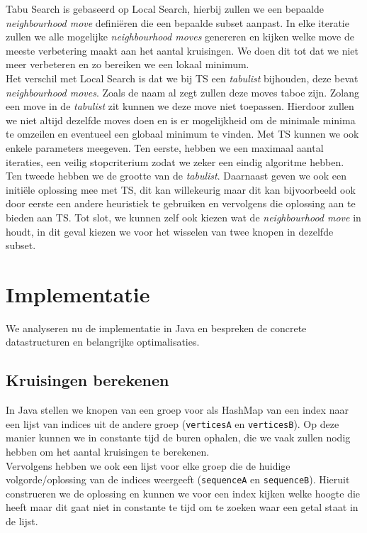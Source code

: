 \documentclass[kulak]{kulakarticle} %
\begin{document}
Tabu Search is gebaseerd op Local Search, hierbij zullen we een bepaalde \textit{neighbourhood move} definiëren die een bepaalde subset aanpast. In elke iteratie zullen we alle mogelijke \textit{neighbourhood moves} genereren en kijken welke move de meeste verbetering maakt aan het aantal kruisingen. We doen dit tot dat we niet meer verbeteren en zo bereiken we een lokaal minimum. \\

\noindent Het verschil met Local Search is dat we bij TS een \textit{tabulist} bijhouden, deze bevat \textit{neighbourhood moves}. Zoals de naam al zegt zullen deze moves taboe zijn. Zolang een move in de \textit{tabulist} zit kunnen we deze move niet toepassen. Hierdoor zullen we niet altijd dezelfde moves doen en is er mogelijkheid om de minimale minima te omzeilen en eventueel een globaal minimum te vinden. Met TS kunnen we ook enkele parameters meegeven. Ten eerste, hebben we een maximaal aantal iteraties, een veilig stopcriterium zodat we zeker een eindig algoritme hebben. Ten tweede hebben we de grootte van de \textit{tabulist}. Daarnaast geven we ook een initiële oplossing mee met TS, dit kan willekeurig maar dit kan bijvoorbeeld ook door eerste een andere heuristiek te gebruiken en vervolgens die oplossing aan te bieden aan TS. Tot slot, we kunnen zelf ook kiezen wat de \textit{neighbourhood move} in houdt, in dit geval kiezen we voor het wisselen van twee knopen in dezelfde subset.

\section{Implementatie}

We analyseren nu de implementatie in Java en bespreken de concrete datastructuren en belangrijke optimalisaties.

\subsection{Kruisingen berekenen}

In Java stellen we knopen van een groep voor als HashMap van een index naar een lijst van indices uit de andere groep (\texttt{verticesA} en \texttt{verticesB}). Op deze manier kunnen we in constante tijd de buren ophalen, die we vaak zullen nodig hebben om het aantal kruisingen te berekenen. \\

\noindent Vervolgens hebben we ook een lijst voor elke groep die de huidige volgorde/oplossing van de indices weergeeft (\texttt{sequenceA} en \texttt{sequenceB}). Hieruit construeren we de oplossing en kunnen we voor een index kijken welke hoogte die heeft maar dit gaat niet in constante te tijd om te zoeken waar een getal staat in de lijst. \\
\end{document}
